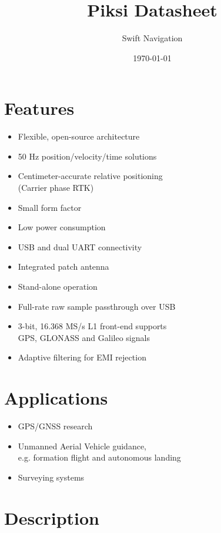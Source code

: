 \documentclass{article}
\title{Piksi Datasheet}
\author{Swift Navigation}
\date{\today}
\begin{document}
\maketitle

\begin{multicols*}{2}
\raggedcolumns

\section*{Features}
\large
\label{sec:Features}
\begin{itemize}
  \bulletnoindent
  \item Flexible, open-source architecture
  \item 50 Hz position/velocity/time solutions
  \item Centimeter-accurate relative positioning\\(Carrier phase RTK)
  \item Small form factor
  \item Low power consumption
  \item USB and dual UART connectivity
  \item Integrated patch antenna
  \item Stand-alone operation
  \item Full-rate raw sample passthrough over USB
  \item 3-bit, 16.368 MS/s L1 front-end supports\\GPS, GLONASS and Galileo signals
  \item Adaptive filtering for EMI rejection
\end{itemize}
\normalsize

\section*{Applications}
\large
\label{sec:Applications}
\begin{itemize}
  \bulletnoindent
  \item GPS/GNSS research
  \item Unmanned Aerial Vehicle guidance,\\e.g. formation flight and autonomous landing
  \item Surveying systems
\end{itemize}
\normalsize

\section*{Description}


\end{multicols*}
\end{document}
